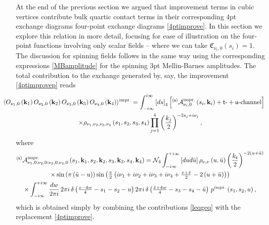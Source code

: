 \documentclass[11pt,a4paper]{article}
\begin{document}
At the end of the previous section we argued that improvement terms in cubic vertices contribute bulk quartic contact terms in their corresponding 4pt exchange diagrams four-point exchange diagrams \eqref{4ptimprove}. In this section we explore this relation in more detail, focusing for ease of illustration on the four-point functions involving only scalar fields -- where we can take ${\mathfrak{C}_{\nu_i,0}\left(s_i\right)=1}$. The discussion for spinning fields follows in the same way using the corresponding expressions \eqref{MBamplitude} for the spinning 3pt Mellin-Barnes amplitudes. The total contribution to the exchange generated by, say, the improvement \eqref{4ptimprovep} reads 
\begin{multline}\label{4ptimprov}
   \hspace*{-0.7cm} \langle O_{\nu_1,0}\left({\bf k}_1\right)O_{\nu_2,0}\left({\bf k}_2\right)O_{\nu_3,0}\left({\bf k}_3\right) O_{\nu_4,0}\left({\bf k}_4\right) \rangle^{\text{impr.}} = \int^{i\infty}_{-i\infty} \left[ds\right]_4 \left[{}^{({\sf s})}{\cal A}^{\text{impr.}}_{\nu_i,0}\left(s_i,{\bf k}_i\right)+{\sf t}\text{-}+{\sf u}\text{-channel}\right] \\ \times \rho_{\nu_1,\nu_2,\nu_3,\nu_4}\left(s_1,s_2,s_3,s_4\right) \prod
   ^4_{j=1}\left(\frac{k_j}{2}\right)^{-2s_j+i\nu_j},
\end{multline}
where 
\begin{multline}\label{totalimp}
      {}^{({\sf s})}{\cal A}^{\text{impr.}}_{\nu_1,0;\nu_2,0;\nu_3,0;\nu_4,0}\left(s_1,{\bf k}_1,s_2,{\bf k}_2,s_3,{\bf k}_3,s_4,{\bf k}_4\right)=  {\cal N}_4\int^{+i\infty}_{-i\infty}\left[du d{\bar u}\right] \rho_{\nu,\nu}\left(u,{\bar u}\right)\left(\frac{k_{\sf s}}{2}\right)^{-2\left(u+{\bar u}\right)} \\ \times  \sin \left(\pi \left({\bar u}-u\right)\right)\sin \left(\tfrac{\pi}{2}  \left(i \nu_1+i \nu_2+i \nu_3+i \nu_4+\tfrac{x+{\bar x}}{2}-2\left(u+{\bar u}\right)\right)\right)\\ \times \int_{-i\infty}^{+i\infty}\frac{dw}{2\pi i}\, 2\pi i\, \delta\left(\tfrac{x-4w}{4}-s_1-s_2-u\right) 2\pi i\, \delta\left(\tfrac{{\bar x}+4w}{4}-s_3-s_4-{\bar u}\right) \,p^{\text{impr.}}\left(s_1,s_2,u\right),
\end{multline}
which is obtained simply by combining the contributions \eqref{leqgeq} with the replacement \eqref{4ptimprove}. 
\end{document}
